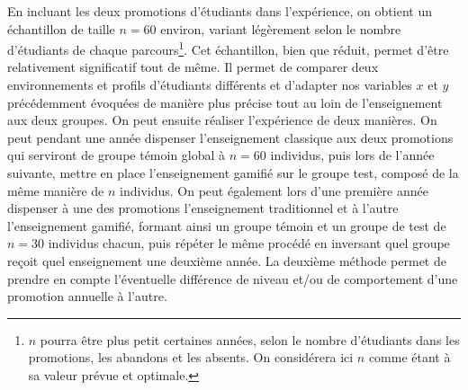 En incluant les deux promotions d'étudiants dans l'expérience, on obtient un échantillon de taille $n = 60$ environ, variant légèrement selon le nombre d'étudiants de chaque parcours\footnote{$n$ pourra être plus petit certaines années, selon le nombre d'étudiants dans les promotions, les abandons et les absents. On considérera ici $n$ comme étant à sa valeur prévue et optimale.}. Cet échantillon, bien que réduit, permet d'être relativement significatif tout de même. Il permet de comparer deux environnements et profils d'étudiants différents et d'adapter nos variables $x$ et $y$ précédemment évoquées de manière plus précise tout au loin de l'enseignement aux deux groupes. On peut ensuite réaliser l'expérience de deux manières. On peut pendant une année dispenser l'enseignement classique aux deux promotions qui serviront de groupe témoin global à $n = 60$ individus, puis lors de l'année suivante, mettre en place l'enseignement gamifié sur le groupe test, composé de la même manière de $n$ individus. On peut également lors d'une première année dispenser à une des promotions l'enseignement traditionnel et à l'autre l'enseignement gamifié, formant ainsi un groupe témoin et un groupe de test de $n = 30$ individus chacun, puis répéter le même procédé en inversant quel groupe reçoit quel enseignement une deuxième année. La deuxième méthode permet de prendre en compte l'éventuelle différence de niveau et/ou de comportement d'une promotion annuelle à l'autre. \par